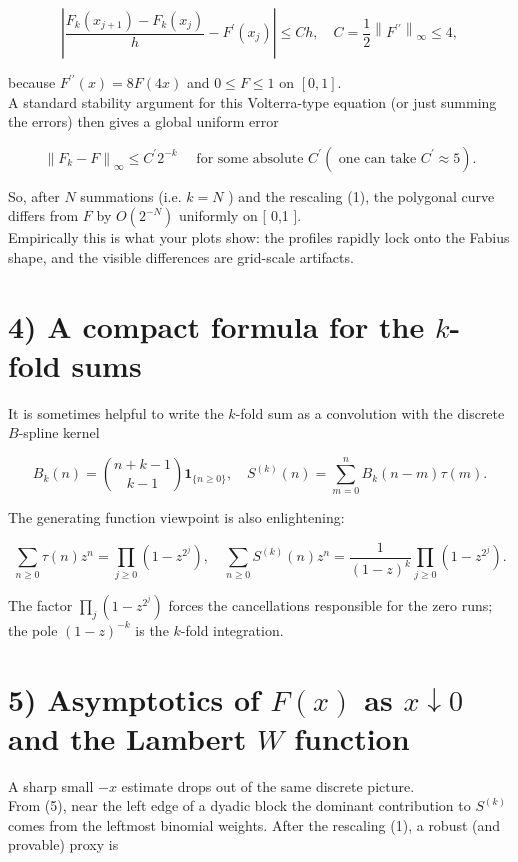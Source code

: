 \documentclass[10pt]{article}
\begin{document}
$$
\left|\frac{F_{k}\left(x_{j+1}\right)-F_{k}\left(x_{j}\right)}{h}-F^{\prime}\left(x_{j}\right)\right| \leq C h, \quad C=\frac{1}{2}\left\|F^{\prime \prime}\right\|_{\infty} \leq 4,
$$

because $F^{\prime \prime}(x)=8 F(4 x)$ and $0 \leq F \leq 1$ on $[0,1]$.\\
A standard stability argument for this Volterra-type equation (or just summing the errors) then gives a global uniform error


\begin{equation*}
\left\|F_{k}-F\right\|_{\infty} \leq C^{\prime} 2^{-k} \quad \text { for some absolute } C^{\prime}\left(\text { one can take } C^{\prime} \approx 5\right) . \tag{4}
\end{equation*}


So, after $N$ summations (i.e. $k=N$ ) and the rescaling (1), the polygonal curve differs from $F$ by $O\left(2^{-N}\right)$ uniformly on [ 0,1 ].\\
Empirically this is what your plots show: the profiles rapidly lock onto the Fabius shape, and the visible differences are grid-scale artifacts.

\section*{4) A compact formula for the $k$-fold sums}
It is sometimes helpful to write the $k$-fold sum as a convolution with the discrete $B$-spline kernel


\begin{equation*}
B_{k}(n)=\binom{n+k-1}{k-1} \mathbf{1}_{\{n \geq 0\}}, \quad S^{(k)}(n)=\sum_{m=0}^{n} B_{k}(n-m) \tau(m) . \tag{5}
\end{equation*}


The generating function viewpoint is also enlightening:


\begin{equation*}
\sum_{n \geq 0} \tau(n) z^{n}=\prod_{j \geq 0}\left(1-z^{2^{j}}\right), \quad \sum_{n \geq 0} S^{(k)}(n) z^{n}=\frac{1}{(1-z)^{k}} \prod_{j \geq 0}\left(1-z^{2^{j}}\right) . \tag{6}
\end{equation*}


The factor $\prod_{j}\left(1-z^{2^{j}}\right)$ forces the cancellations responsible for the zero runs; the pole $(1-z)^{-k}$ is the $k$-fold integration.

\section*{5) Asymptotics of $F(x)$ as $x \downarrow 0$ and the Lambert $W$ function}
A sharp small $-x$ estimate drops out of the same discrete picture.\\
From (5), near the left edge of a dyadic block the dominant contribution to $S^{(k)}$ comes from the leftmost binomial weights. After the rescaling (1), a robust (and provable) proxy is
\end{document}
